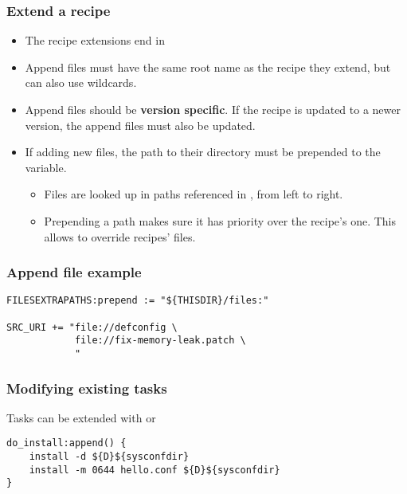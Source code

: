 \begin{frame}[fragile]
  \frametitle{Extend a recipe}
  \begin{itemize}
    \item The recipe extensions end in 
    \item Append files must have the same root name as the recipe they
          extend, but can also use wildcards.
    \item Append files should be {\bf version specific}. If the recipe
      is updated to a newer version, the append files must also be
      updated.
    \item If adding new files, the path to their directory must
          be prepended to the  variable.
    \begin{itemize}
      \item Files are looked up in paths referenced in
            , from left to right.
      \item Prepending a path makes sure it has priority over the recipe's
            one. This allows to override recipes' files.
    \end{itemize}
  \end{itemize}
\end{frame}

\begin{frame}[fragile]
  \frametitle{Append file example}
  \begin{block}{}
    \begin{verbatim}
FILESEXTRAPATHS:prepend := "${THISDIR}/files:"

SRC_URI += "file://defconfig \
            file://fix-memory-leak.patch \
            "
    \end{verbatim}
  \end{block}
\end{frame}

\begin{frame}[fragile]
  \frametitle{Modifying existing tasks}
  Tasks can be extended with  or 
  \begin{block}{}
    \begin{verbatim}
do_install:append() {
    install -d ${D}${sysconfdir}
    install -m 0644 hello.conf ${D}${sysconfdir}
}
    \end{verbatim}
  \end{block}
\end{frame}

